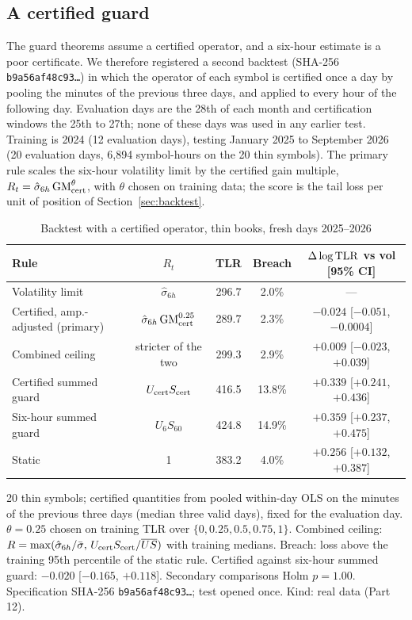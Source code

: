 \subsection{A certified guard}\label{sec:certguard}
The guard theorems assume a certified operator, and a six-hour estimate is a poor certificate. We therefore registered a second backtest (SHA-256 \texttt{b9a56af48c93\ldots}) in which the operator of each symbol is certified once a day by pooling the minutes of the previous three days, and applied to every hour of the following day. Evaluation days are the 28th of each month and certification windows the 25th to 27th; none of these days was used in any earlier test. Training is 2024 (12 evaluation days), testing January 2025 to September 2026 (20 evaluation days, 6{,}894 symbol-hours on the 20 thin symbols). The primary rule scales the six-hour volatility limit by the certified gain multiple, $R_t=\hat\sigma_{6h}\,{\rm GM}_{\rm cert}^{\theta}$, with $\theta$ chosen on training data; the score is the tail loss per unit of position of Section~\ref{sec:backtest}.

\begin{table}[t]\centering\small
\begin{threeparttable}
\caption{Backtest with a certified operator, thin books, fresh days 2025--2026}\label{tab:certguard}
\setlength{\tabcolsep}{3pt}
\begin{tabular}{lcccc}
\toprule
Rule & $R_t$ & TLR & Breach & $\Delta\log{\rm TLR}$ vs vol [95\% CI]\\
\midrule
Volatility limit & $\hat\sigma_{6h}$ & 296.7 & 2.0\% & ---\\
Certified, amp.-adjusted (primary) & $\hat\sigma_{6h}\,{\rm GM}_{\rm cert}^{0.25}$ & 289.7 & 2.3\% & $-0.024$ [$-0.051$, $-0.0004$]\\
Combined ceiling & stricter of the two & 299.3 & 2.9\% & $+0.009$ [$-0.023$, $+0.039$]\\
Certified summed guard & $U_{\rm cert}S_{\rm cert}$ & 416.5 & 13.8\% & $+0.339$ [$+0.241$, $+0.436$]\\
Six-hour summed guard & $U_6S_{60}$ & 424.8 & 14.9\% & $+0.359$ [$+0.237$, $+0.475$]\\
Static & 1 & 383.2 & 4.0\% & $+0.256$ [$+0.132$, $+0.387$]\\
\bottomrule
\end{tabular}
\begin{tablenotes}\footnotesize\item 20 thin symbols; certified quantities from pooled within-day OLS on the minutes of the previous three days (median three valid days), fixed for the evaluation day. $\theta=0.25$ chosen on training TLR over $\{0,0.25,0.5,0.75,1\}$. Combined ceiling: $R=\max(\hat\sigma_{6h}/\bar\sigma,\,U_{\rm cert}S_{\rm cert}/\overline{US})$ with training medians. Breach: loss above the training 95th percentile of the static rule. Certified against six-hour summed guard: $-0.020$ [$-0.165$, $+0.118$]. Secondary comparisons Holm $p=1.00$. Specification SHA-256 \texttt{b9a56af48c93\ldots}; test opened once. Kind: real data (Part 12).\end{tablenotes}
\end{threeparttable}
\end{table}

